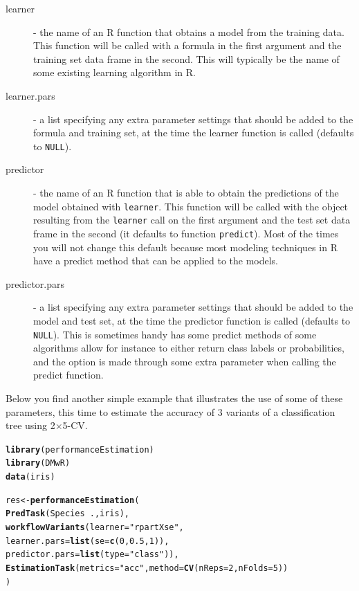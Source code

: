 \documentclass[10pt,a4paper]{article}\usepackage[]{graphicx}\usepackage[]{color}
\makeatletter
\newcommand{\hlnum}[1]{\textcolor[rgb]{0.686,0.059,0.569}{#1}}%
\newcommand{\hlstr}[1]{\textcolor[rgb]{0.192,0.494,0.8}{#1}}%
\newcommand{\hlopt}[1]{\textcolor[rgb]{0,0,0}{#1}}%
\newcommand{\hlstd}[1]{\textcolor[rgb]{0.345,0.345,0.345}{#1}}%
\newcommand{\hlkwb}[1]{\textcolor[rgb]{0.69,0.353,0.396}{#1}}%
\newcommand{\hlkwc}[1]{\textcolor[rgb]{0.333,0.667,0.333}{#1}}%
\newcommand{\hlkwd}[1]{\textcolor[rgb]{0.737,0.353,0.396}{\textbf{#1}}}%
\newenvironment{kframe}{%
 \def\at@end@of@kframe{}%
 \ifinner\ifhmode%
  \def\at@end@of@kframe{\end{minipage}}%
  \begin{minipage}{\columnwidth}%
 \fi\fi%
 \def\FrameCommand##1{\hskip\@totalleftmargin \hskip-\fboxsep
 \colorbox{shadecolor}{##1}\hskip-\fboxsep
     \hskip-\linewidth \hskip-\@totalleftmargin \hskip\columnwidth}%
 \MakeFramed {\advance\hsize-\width
   \@totalleftmargin\z@ \linewidth\hsize
   \@setminipage}}%
 {\par\unskip\endMakeFramed%
 \at@end@of@kframe}
\newenvironment{knitrout}{}{} %
\makeatother
\begin{document}
\begin{description}
\item[learner] - the name of an R function that obtains a model from the training data. This function will be called with a formula in the first argument and the training set data frame in the second. This will typically be the name of some existing learning algorithm in R.
\item[learner.pars] - a list specifying any extra parameter settings that should be added to the formula and training set, at the time the learner function is called (defaults to \texttt{NULL}).
\item[predictor] - the name of an R function that is able to obtain the predictions of the model obtained with \texttt{learner}. This function will be called with the object resulting from the \texttt{learner} call on the first argument and the test set data frame in the second (it defaults to function \texttt{predict}). Most of the times you will not change this default because most modeling techniques in R have a predict method that can be applied to the models.
\item[predictor.pars] - a list specifying any extra parameter settings that should be added to the model and test set, at the time the predictor function is called (defaults to \texttt{NULL}). This is sometimes handy has some predict methods of some algorithms allow for instance to either return class labels or probabilities, and the option is made through some extra parameter when calling the predict function.
\end{description}

Below you find another simple example that illustrates the use of some of these parameters, this time to estimate the accuracy of 3 variants of a classification tree using 2$\times$5-CV.


\begin{knitrout}\footnotesize
{}\color{fgcolor}\begin{kframe}
\begin{alltt}
\hlkwd{library}\hlstd{(performanceEstimation)}
\hlkwd{library}\hlstd{(DMwR)}
\hlkwd{data}\hlstd{(iris)}

\hlstd{res} \hlkwb{<-} \hlkwd{performanceEstimation}\hlstd{(}
         \hlkwd{PredTask}\hlstd{(Species} \hlopt{~} \hlstd{.,iris),}
         \hlkwd{workflowVariants}\hlstd{(}\hlkwc{learner}\hlstd{=}\hlstr{"rpartXse"}\hlstd{,}
                          \hlkwc{learner.pars}\hlstd{=}\hlkwd{list}\hlstd{(}\hlkwc{se}\hlstd{=}\hlkwd{c}\hlstd{(}\hlnum{0}\hlstd{,}\hlnum{0.5}\hlstd{,}\hlnum{1}\hlstd{)),}
                          \hlkwc{predictor.pars}\hlstd{=}\hlkwd{list}\hlstd{(}\hlkwc{type}\hlstd{=}\hlstr{"class"}\hlstd{)),}
         \hlkwd{EstimationTask}\hlstd{(}\hlkwc{metrics}\hlstd{=}\hlstr{"acc"}\hlstd{,}\hlkwc{method}\hlstd{=}\hlkwd{CV}\hlstd{(}\hlkwc{nReps}\hlstd{=}\hlnum{2}\hlstd{,}\hlkwc{nFolds}\hlstd{=}\hlnum{5}\hlstd{))}
         \hlstd{)}
\end{alltt}
\end{kframe}
\end{knitrout}
\end{document}
